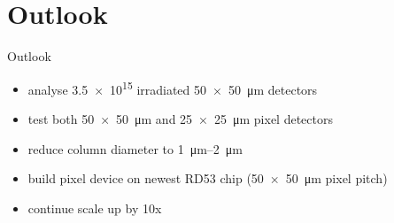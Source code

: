 \section{Outlook}
\begin{frame}{Outlook}

	\begin{minipage}[c][4cm]{\textwidth}
		\begin{itemize}\itemfill
			\item analyse \SI{3.5e15}{\ncm} irradiated \SI{50x50}{\micro\meter} detectors
			\item test both \SI{50x50}{\micro\meter} and \SI{25x25}{\micro\meter} pixel detectors
			\item reduce column diameter to \SIrange{1}{2}{\micro\meter}
			\item build pixel device on newest RD53 chip (\SI{50x50}{\micro\meter} pixel pitch)
			\item continue scale up by 10x
		\end{itemize}
	\end{minipage}
	
\end{frame}
